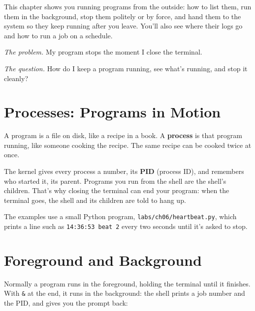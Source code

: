 
\begin{chapterintro}

This chapter shows you running programs from the outside: how to list them, run them in the background, stop them politely or by force, and hand them to the system so they keep running after you leave. You'll also see where their logs go and how to run a job on a schedule.

\end{chapterintro}

\emph{The problem.} My program stops the moment I close the terminal.

\emph{The question.} How do I keep a program running, see what's running, and stop it cleanly?

\section{Processes: Programs in Motion}\label{06-programs-that-keep-running:processes-programs-in-motion}

A program is a file on disk, like a recipe in a book. A \textbf{process} is that program running, like someone cooking the recipe. The same recipe can be cooked twice at once.

The kernel gives every process a number, its \textbf{PID} (process ID), and remembers who started it, its parent. Programs you run from the shell are the shell's children. That's why closing the terminal can end your program: when the terminal goes, the shell and its children are told to hang up.

The examples use a small Python program, \texttt{labs/}\allowbreak{}\texttt{ch06/}\allowbreak{}\texttt{heartbeat.py}, which prints a line such as \texttt{14:36:53\ beat\ 2} every two seconds until it's asked to stop.

\section{Foreground and Background}\label{06-programs-that-keep-running:foreground-and-background}

Normally a program runs in the foreground, holding the terminal until it finishes. With \texttt{\&} at the end, it runs in the background: the shell prints a job number and the PID, and gives you the prompt back:

\begin{codeblock}

\begin{Shaded}
\begin{Highlighting}[]
\OperatorTok{\textgreater{}}\KeywordTok{\&}
\end{Highlighting}
\end{Shaded}

\end{codeblock}

